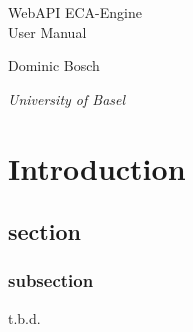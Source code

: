 \documentclass{article}
\newcommand*{\createTitlePage}{\begingroup
\centering
\vspace*{6\baselineskip}

{\Huge WebAPI ECA-Engine}\\[4\baselineskip]

{\LARGE User Manual} \\[\baselineskip]

\vspace*{25\baselineskip}

{Dominic Bosch\par}
{\itshape University of Basel\par}




\endgroup}
\begin{document}
\clearpage\createTitlePage
\thispagestyle{empty}



\newpage
\tableofcontents
\newpage


\section{Introduction}
\subsection{section}
\subsubsection{subsection}
t.b.d.
\end{document}
